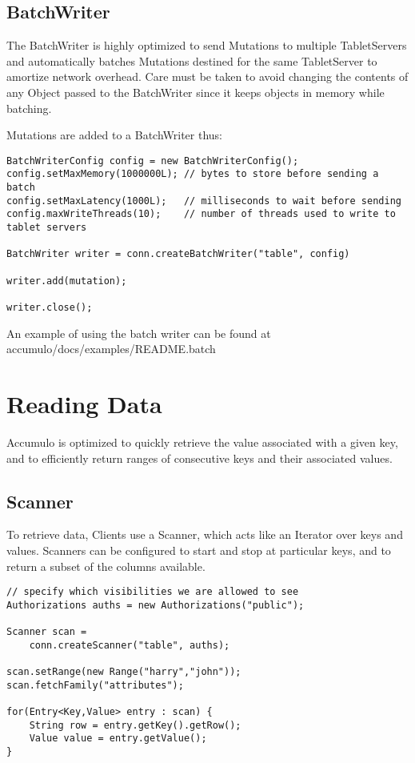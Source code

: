\subsection{BatchWriter}
The BatchWriter is highly optimized to send Mutations to multiple TabletServers
and automatically batches Mutations destined for the same TabletServer to
amortize network overhead. Care must be taken to avoid changing the contents of
any Object passed to the BatchWriter since it keeps objects in memory while
batching.

Mutations are added to a BatchWriter thus:

\small
\begin{verbatim}
BatchWriterConfig config = new BatchWriterConfig();
config.setMaxMemory(1000000L); // bytes to store before sending a batch
config.setMaxLatency(1000L);   // milliseconds to wait before sending
config.maxWriteThreads(10);    // number of threads used to write to tablet servers

BatchWriter writer = conn.createBatchWriter("table", config)

writer.add(mutation);

writer.close();
\end{verbatim}
\normalsize

An example of using the batch writer can be found at\\
accumulo/docs/examples/README.batch

\section{Reading Data}

Accumulo is optimized to quickly retrieve the value associated with a given key, and
to efficiently return ranges of consecutive keys and their associated values.

\subsection{Scanner}

To retrieve data, Clients use a Scanner, which acts like an Iterator over
keys and values. Scanners can be configured to start and stop at particular keys, and
to return a subset of the columns available.

\small
\begin{verbatim}
// specify which visibilities we are allowed to see
Authorizations auths = new Authorizations("public");

Scanner scan =
    conn.createScanner("table", auths);

scan.setRange(new Range("harry","john"));
scan.fetchFamily("attributes");

for(Entry<Key,Value> entry : scan) {
    String row = entry.getKey().getRow();
    Value value = entry.getValue();
}
\end{verbatim}
\normalsize

